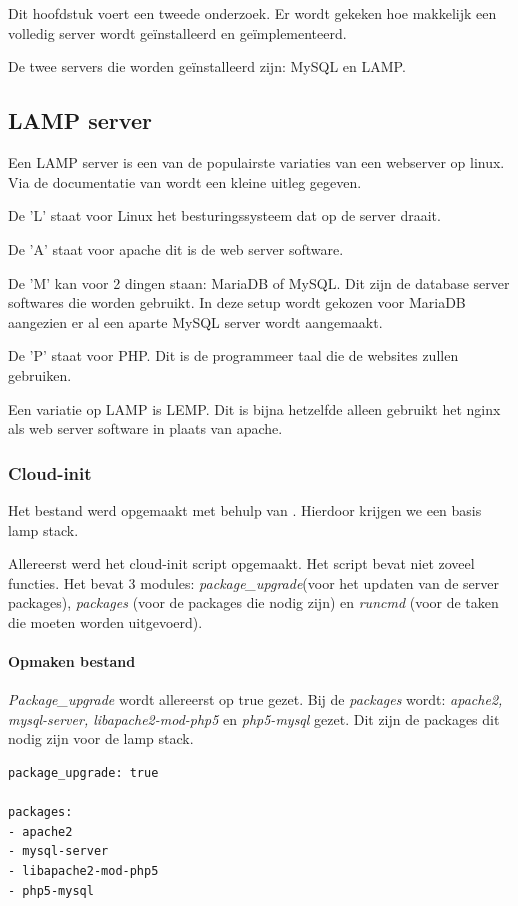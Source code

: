 \chapter{}
\label{ch:serverconf}
Dit hoofdstuk voert een tweede onderzoek. Er wordt gekeken hoe makkelijk een volledig server wordt geïnstalleerd en geïmplementeerd. 

De twee servers die worden geïnstalleerd zijn: MySQL en LAMP.

\section{LAMP server}
Een LAMP server is een van de populairste variaties van een webserver op linux. Via de documentatie van \autocite{lamp} wordt een kleine uitleg gegeven.

De 'L' staat voor Linux het besturingssysteem dat op de server draait. 

De 'A' staat voor apache dit is de web server software. 

De 'M' kan voor 2 dingen staan: MariaDB of MySQL. Dit zijn de database server softwares die worden gebruikt. In deze setup wordt gekozen voor MariaDB aangezien er al een aparte MySQL server wordt aangemaakt.

De 'P' staat voor PHP. Dit is de programmeer taal die de websites zullen gebruiken.

Een variatie op LAMP is LEMP. Dit is bijna hetzelfde alleen gebruikt het nginx als web server software in plaats van apache.


\subsection{Cloud-init}
Het bestand werd opgemaakt met behulp van \autocite{butcher}. Hierdoor krijgen we een basis lamp stack.

Allereerst werd het cloud-init script opgemaakt. Het script bevat niet zoveel functies. Het bevat 3 modules: \textit{package\_upgrade}(voor het updaten van de server packages), \textit{packages} (voor de packages die nodig zijn) en \textit{runcmd} (voor de taken die moeten worden uitgevoerd).

\subsubsection{Opmaken bestand}
\textit{Package\_upgrade} wordt allereerst op true gezet. Bij de \textit{packages} wordt: \textit{apache2, mysql-server, libapache2-mod-php5} en \textit{php5-mysql} gezet. Dit zijn de packages dit nodig zijn voor de lamp stack.
\begin{lstlisting}[basicstyle=\small]
package_upgrade: true

packages:
- apache2
- mysql-server
- libapache2-mod-php5
- php5-mysql
\end{lstlisting}

